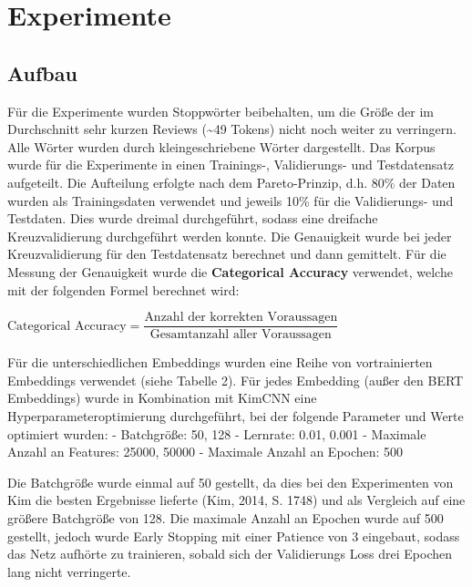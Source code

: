 \documentclass[11pt]{article}
\begin{document}
    \hypertarget{experimente}{%
\section{Experimente}\label{experimente}}

\hypertarget{aufbau}{%
\subsection{Aufbau}\label{aufbau}}

Für die Experimente wurden Stoppwörter beibehalten, um die Größe der im
Durchschnitt sehr kurzen Reviews (\textasciitilde49 Tokens) nicht noch
weiter zu verringern. Alle Wörter wurden durch kleingeschriebene Wörter
dargestellt. Das Korpus wurde für die Experimente in einen Trainings-,
Validierungs- und Testdatensatz aufgeteilt. Die Aufteilung erfolgte nach
dem Pareto-Prinzip, d.h. 80\% der Daten wurden als Trainingsdaten
verwendet und jeweils 10\% für die Validierungs- und Testdaten. Dies
wurde dreimal durchgeführt, sodass eine dreifache Kreuzvalidierung
durchgeführt werden konnte. Die Genauigkeit wurde bei jeder
Kreuzvalidierung für den Testdatensatz berechnet und dann gemittelt. Für
die Messung der Genauigkeit wurde die \textbf{Categorical Accuracy}
verwendet, welche mit der folgenden Formel berechnet wird:

\(\text{Categorical Accuracy} = \dfrac{\text{Anzahl der korrekten Voraussagen}}{\text{Gesamtanzahl aller Voraussagen}}\)

    Für die unterschiedlichen Embeddings wurden eine Reihe von
vortrainierten Embeddings verwendet (siehe Tabelle 2). Für jedes
Embedding (außer den BERT Embeddings) wurde in Kombination mit KimCNN
eine Hyperparameteroptimierung durchgeführt, bei der folgende Parameter
und Werte optimiert wurden: - Batchgröße: 50, 128 - Lernrate: 0.01,
0.001 - Maximale Anzahl an Features: 25000, 50000 - Maximale Anzahl an
Epochen: 500

Die Batchgröße wurde einmal auf 50 gestellt, da dies bei den
Experimenten von Kim die besten Ergebnisse lieferte (Kim, 2014, S. 1748)
und als Vergleich auf eine größere Batchgröße von 128. Die maximale
Anzahl an Epochen wurde auf 500 gestellt, jedoch wurde Early Stopping
mit einer Patience von 3 eingebaut, sodass das Netz aufhörte zu
trainieren, sobald sich der Validierungs Loss drei Epochen lang nicht
verringerte.
\end{document}
